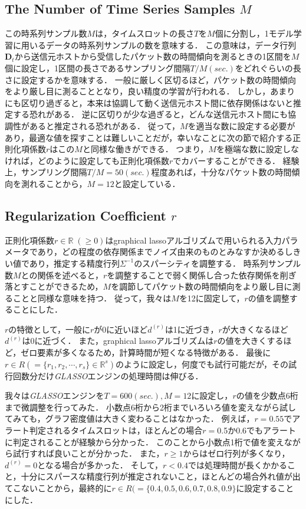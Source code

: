 \documentclass[conference]{IEEEtran}
\begin{document}
\subsection{The Number of Time Series Samples $M$}
この時系列サンプル数$M$は，タイムスロットの長さ$T$を$M$個に分割し，1モデル学習に用いるデータの時系列サンプルの数を意味する．
この意味は，データ行列$\bm{D}_t$から送信元ホストから受信したパケット数の時間傾向を測るときの1区間を$M$個に設定し，1区間の長さであるサンプリング間隔$T/M (sec.)$をどれぐらいの長さに設定するかを意味する．
一般に厳しく区切るほど，パケット数の時間傾向をより厳し目に測ることとなり，良い精度の学習が行われる．
しかし，あまりにも区切り過ぎると，本来は協調して動く送信元ホスト間に依存関係はないと推定する恐れがある．
逆に区切りが少な過ぎると，どんな送信元ホスト間にも協調性があると推定される恐れがある．
従って，$M$を適当な数に設定する必要があり，最適な値を探すことは難しいことだが，幸いなことに次の節で紹介する正則化項係数$r$はこの$M$と同様な働きができる．
つまり，$M$を極端な数に設定しなければ，どのように設定しても正則化項係数$r$でカバーすることができる．
経験上，サンプリング間隔$T/M=50 (sec.)$程度あれば，十分なパケット数の時間傾向を測れることから，$M=12$と設定している．



\subsection{Regularization Coefficient $r$}
正則化項係数$r\in\mathbb{R}\;(\geq 0)$はgraphical lassoアルゴリズムで用いられる入力パラメータであり，どの程度の依存関係までノイズ由来のものとみなすか決めるしきい値であり，推定する精度行列$\Sigma^{-1}$のスパーシティを調整する．
時系列サンプル数$M$との関係を述べると，$r$を調整することで弱く関係し合った依存関係を削ぎ落とすことができるため，$M$を調節してパケット数の時間傾向をより厳し目に測ることと同様な意味を持つ．
従って，我々は$M$を12に固定して，$r$の値を調整することにした．

$r$の特徴として，一般に$r$が0に近いほど$d^{(r)}$は1に近づき，$r$が大きくなるほど$d^{(r)}$は0に近づく．
また，graphical lassoアルゴリズムは$r$の値を大きくするほど，ゼロ要素が多くなるため，計算時間が短くなる特徴がある．
最後に$r \in R ( = \{r_1, r_2, \cdots, r_s\}\in\mathbb{R}^s)$のように設定し，何度でも試行可能だが，その試行回数分だけ{\it GLASSO}エンジンの処理時間は伸びる．

我々は{\it GLASSO}エンジンを$T=600 (sec.), M=12$に設定し，$r$の値を少数点6桁まで微調整を行ってみた．
小数点6桁から2桁までいろいろ値を変えながら試してみても，グラフ密度値は大きく変わることはなかった．
例えば，$r=0.55$でアラート判定されるタイムスロットは，ほとんどの場合$r=$0.5か0.6でもアラートに判定されることが経験から分かった．
このことから小数点1桁で値を変えながら試行すれば良いことが分かった．
また，$r\geq 1$からはゼロ行列が多くなり，$d^{(r)}=0$となる場合が多かった．
そして，$r < 0.4$では処理時間が長くかかること，十分にスパースな精度行列が推定されないこと，ほとんどの場合外れ値が出てこないことから，最終的に$r \in R ( = \{0.4, 0.5, 0.6, 0.7, 0.8, 0.9\}$に設定することにした．
\end{document}
